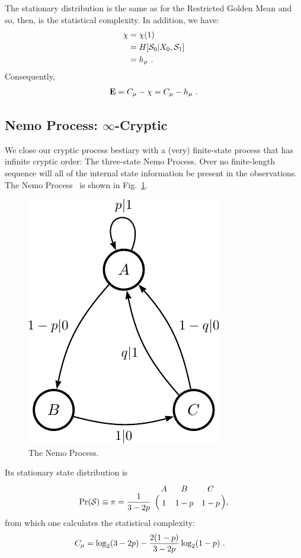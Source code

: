 The stationary distribution is the same as for the Restricted Golden Mean
and so, then, is the statistical complexity. In addition, we have:
\begin{align*}
\chi &= \chi(1) \\
    &= H[\mathcal{S}_0 | {X}_0, \mathcal{S}_1]\\
    &= h_\mu ~.
\end{align*}
Consequently,
\begin{align*}
{\bf E} = C_\mu - \chi = C_\mu - h_\mu ~.
\end{align*}

\subsection{Nemo Process: $\infty$-Cryptic}

We close our cryptic process bestiary with a (very) finite-state process that
has infinite cryptic order: The three-state Nemo Process. Over no finite-length
sequence will all of the internal state information be present in the
observations. The Nemo Process \eM\ is shown in Fig.~\ref{fig:Nemo}.

\begin{figure}[th]
\centering
\includegraphics{../chapter3/figures/nemo}
\caption{The \cryptic{\infty} Nemo Process.
  }
\label{fig:Nemo}
\end{figure}

Its stationary state distribution is
\begin{align*}
\Pr(\CausalState) \equiv \pi = \frac{1}{3-2p}
\bordermatrix{%
& A & B & C \cr
& 1 & 1-p & 1-p
},
\end{align*}
from which one calculates the statistical complexity:
\begin{align*}
C_\mu &= \log_2(3-2p) - \frac{2(1-p)}{3-2p} \log_2 (1-p) ~.
\end{align*}


